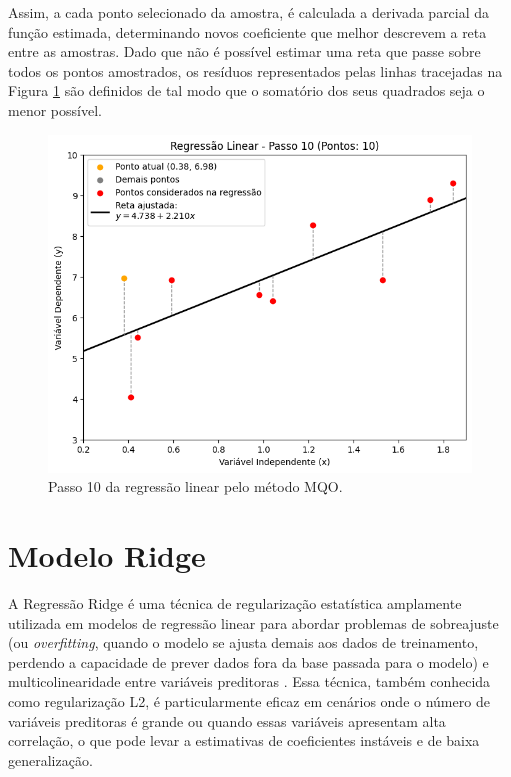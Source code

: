 Assim, a cada ponto selecionado da amostra, é calculada a derivada parcial da função estimada, determinando novos coeficiente que melhor descrevem a reta entre as amostras. Dado que não é possível estimar uma reta que passe sobre todos os pontos amostrados, os resíduos representados pelas linhas tracejadas na Figura \ref{fig:mqo_10} são definidos de tal modo que o somatório dos seus quadrados seja o menor possível.


\begin{figure}[H]
	\caption{\label{fig:mqo_10}Passo 10 da regressão linear pelo método MQO.}
	\begin{center}
		\includegraphics[scale=0.6]{figuras/RL_step_10.png}
	\end{center}
\end{figure}


\section{Modelo Ridge}
\label{sec:regressao-ridge}

A Regressão Ridge é uma técnica de regularização estatística amplamente utilizada em modelos de regressão linear para abordar problemas de sobreajuste (ou \textit{overfitting}, quando o modelo se ajusta demais aos dados de treinamento, perdendo a capacidade de prever dados fora da base passada para o modelo) e multicolinearidade entre variáveis preditoras \cite{McDonald:2009:RR}. Essa técnica, também conhecida como regularização L2, é particularmente eficaz em cenários onde o número de variáveis preditoras é grande ou quando essas variáveis apresentam alta correlação, o que pode levar a estimativas de coeficientes instáveis e de baixa generalização.

